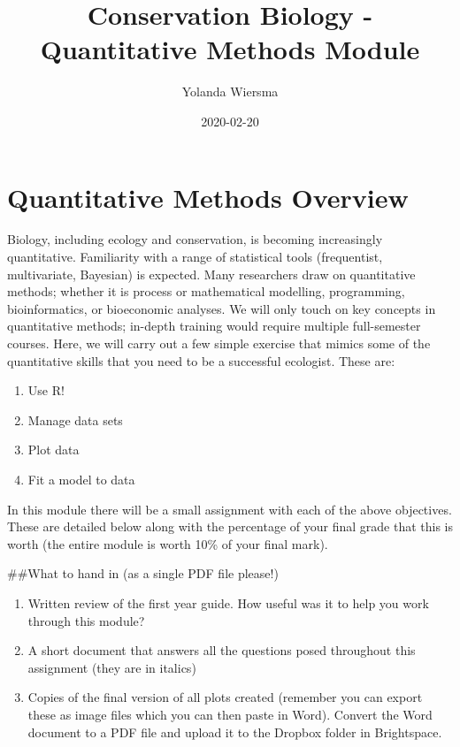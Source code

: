\documentclass[]{book}
\title{Conservation Biology - Quantitative Methods Module}
\author{Yolanda Wiersma}
\date{2020-02-20}
\providecommand{\tightlist}{%
  \setlength{\itemsep}{0pt}\setlength{\parskip}{0pt}}
\begin{document}
\maketitle

{
\setcounter{tocdepth}{1}
\tableofcontents
}
\hypertarget{quantitative-methods-overview}{%
\chapter{Quantitative Methods Overview}\label{quantitative-methods-overview}}

Biology, including ecology and conservation, is becoming increasingly quantitative. Familiarity with a range of statistical tools (frequentist, multivariate, Bayesian) is expected. Many researchers draw on quantitative methods; whether it is process or mathematical modelling, programming, bioinformatics, or bioeconomic analyses. We will only touch on key concepts in quantitative methods; in-depth training would require multiple full-semester courses. Here, we will carry out a few simple exercise that mimics some of the quantitative skills that you need to be a successful ecologist. These are:

\begin{enumerate}
\def\labelenumi{\arabic{enumi}.}
\tightlist
\item
  Use R!
\item
  Manage data sets
\item
  Plot data
\item
  Fit a model to data
\end{enumerate}

In this module there will be a small assignment with each of the above objectives. These are detailed below along with the percentage of your final grade that this is worth (the entire module is worth 10\% of your final mark).

\#\#What to hand in (as a single PDF file please!)

\begin{enumerate}
\def\labelenumi{\arabic{enumi}.}
\item
  Written review of the first year guide. How useful was it to help you work through this module?
\item
  A short document that answers all the questions posed throughout this assignment (they are in italics)
\item
  Copies of the final version of all plots created (remember you can export these as image files which you can then paste in Word). Convert the Word document to a PDF file and upload it to the Dropbox folder in Brightspace.
\end{enumerate}
\end{document}
